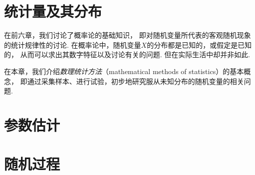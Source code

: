 





\chapter{统计量及其分布}
在前六章，我们讨论了概率论的基础知识，
即对随机变量所代表的客观随机现象的统计规律性的讨论.
在概率论中，随机变量\(X\)的分布都是已知的，或假定是已知的，
从而可以求出其数字特征以及讨论有关的问题.
但在实际生活中却并非如此.

在本章，我们介绍\emph{数理统计方法}（mathematical methods of statistics）的基本概念，
即通过采集样本、进行试验，初步地研究服从未知分布的随机变量的相关问题.








\chapter{参数估计}











\chapter{随机过程}



